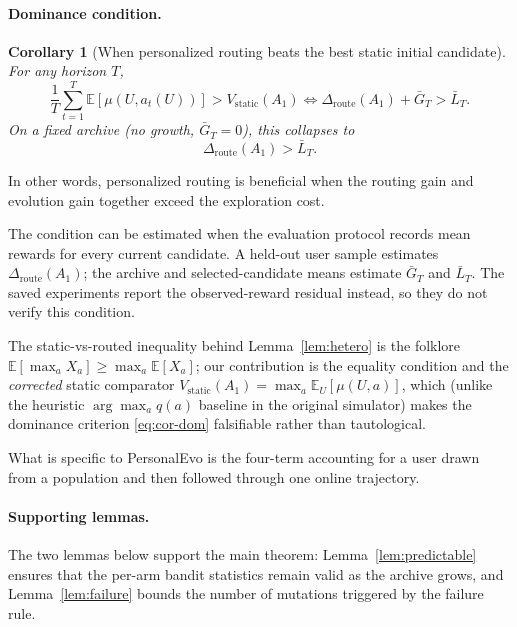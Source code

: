 \documentclass{article} %
\newtheorem{corollary}[theorem]{Corollary}
\providecommand{\E}{\mathbb{E}}
\begin{document}
\paragraph{Dominance condition.}

\label{sec:method-cor-dom}

\begin{corollary}[When personalized routing beats the best static initial candidate]
\label{cor:dominance}
For any horizon $T$,
\begin{equation}
\label{eq:cor-dom}
\frac{1}{T}\sum_{t=1}^T \E[\mu(U, a_t(U))] > V_{\mathrm{static}}(A_1)
\iff
\Delta_{\mathrm{route}}(A_1) + \bar G_T > \bar L_T.
\end{equation}
On a fixed archive (no growth, $\bar G_T = 0$), this collapses to
\begin{equation}
\label{eq:cor-dom-fixed}
\Delta_{\mathrm{route}}(A_1) > \bar L_T.
\end{equation}
\end{corollary}

In other words, personalized routing is beneficial when the routing gain and evolution gain together exceed the exploration cost.

The condition can be estimated when the evaluation protocol records mean
rewards for every current candidate. A held-out user sample estimates
\(\Delta_{\mathrm{route}}(A_1)\); the archive and selected-candidate means
estimate \(\bar G_T\) and \(\bar L_T\). The saved experiments report the
observed-reward residual instead, so they do not verify this condition.

The static-vs-routed inequality behind Lemma~\ref{lem:hetero} is the folklore $\E[\max_a X_a]\ge\max_a\E[X_a]$; our contribution is the equality condition and the \emph{corrected} static comparator $V_{\mathrm{static}}(A_1)=\max_a\E_U[\mu(U,a)]$, which (unlike the heuristic $\arg\max_a q(a)$ baseline in the original simulator) makes the dominance criterion \eqref{eq:cor-dom} falsifiable rather than tautological.

What is specific to PersonalEvo is the four-term accounting for a user drawn
from a population and then followed through one online trajectory.

\paragraph{Supporting lemmas.}

\label{sec:method-supporting}

The two lemmas below support the main theorem: Lemma~\ref{lem:predictable} ensures that the per-arm bandit statistics remain valid as the archive grows, and Lemma~\ref{lem:failure} bounds the number of mutations triggered by the failure rule.
\end{document}
